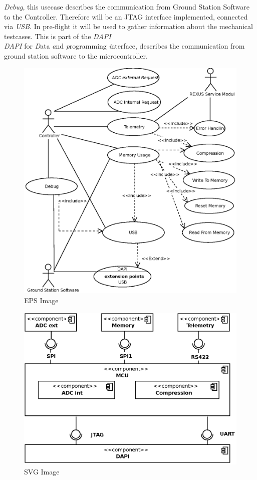 \textit{Debug}, this usecase describes the communication from Ground Station Software to the Controller. Therefore will be an JTAG interface implemented, connected via \textit{USB}. In pre-flight it will be used to gather information about the mechanical testcases. This is part of the  \textit{DAPI}\\
\textit{DAPI} for \textit{D}ata \textit{a}nd \textit{p}rogramming  \textit{i}nterface, describes the communication from ground station software to the microcontroller. 
\begin{figure}[htbp]
	\centering
	  \includegraphics{HERMESS_USECASE.eps}
	\caption{EPS Image}
\end{figure}
\begin{figure}[htbp]
	\centering
	\includegraphics{Components.eps}
	\caption{SVG Image}
\end{figure}
